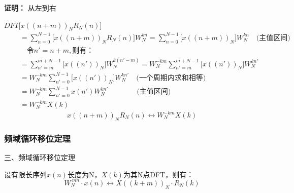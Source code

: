 \documentclass[notheorems,compress,mathserif,table]{beamer}
\begin{document}
%
%
%
\begin{frame}[shrink]\frametitle{}%
\textbf{证明：}  从左到右

$DFT\bigg[ x((n+m))_N R_N(n)\bigg]$
\begin{equation*}
\begin{split}
    \quad
         &= \sum_{n=0}^{N-1}\bigg[x((n+m))_N R_N(n)\bigg]W_N^{kn}
          = \sum_{n=0}^{N-1}\bigg[x((n+m))_N\bigg]W_N^{kn} \quad\mbox{(主值区间)}\quad\\
         &\quad  \mbox{令} n' =n+m,\mbox{则有：}  \\
         &= \sum_{n'=m}^{m+N-1}\bigg[x((n'))_N\bigg]W_N^{k(n'-m)}
          = W_N^{-km}\sum_{n'=m}^{m+N-1}\bigg[x((n'))_N\bigg]W_N^{kn'}\\
         &= W_N^{-km}\sum_{n'=0}^{N-1}\bigg[x((n'))_N\bigg]W_N^{kn'}\quad\mbox{(一个周期内求和相等)}\\
         &= W_N^{-km}\sum_{n'=0}^{N-1}x(n')W_N^{kn'}  \quad\quad\quad\quad\mbox{(主值区间)}\\
         &= W_N^{-km}X(k)
\end{split}
\end{equation*}
$$x((n+m))_N R_N(n) \longleftrightarrow W_N^{-km}X(k)$$

\end{frame}
%
%
%
\begin{frame}[shrink]\frametitle{频域循环移位定理}%
三、频域循环移位定理

设有限长序列$x(n)$长度为N，$X(k)$为其N点DFT，则有：
$$W_N^{\ mn}\cdot x(n) \longleftrightarrow X((k+m))_N\cdot R_N(k)$$


\end{frame}
%
%
%
\end{document}
